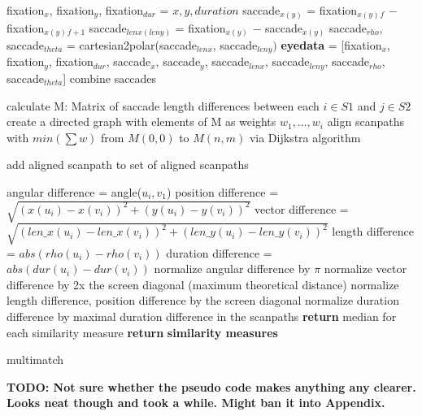 \documentclass[a4paper, 12pt]{scrreprt}
\begin{document}
\begin{algorithm}[H]
	\begin{small}
		
		{ 
			{
				fixation$_x$, fixation$_y$, fixation$_{dur}$ = $x, y, duration$ \;
				saccade$_{x(y)}$ = fixation$_{x(y)}$$_{f}$ $-$ fixation$_{x(y)}$$_{f+1}$ \;
				saccade$_{lenx(leny)}$ = fixation$_{x(y)}$ $-$ saccade$_{x(y)}$\;
				saccade$_{rho}$, saccade$_{theta}$ = cartesian2polar(saccade$_{lenx}$, saccade$_{leny})$ \;
				\textbf{eyedata} = [fixation$_x$, fixation$_y$, fixation$_{dur}$, saccade$_x$, saccade$_y$, \newline saccade$_{lenx}$, saccade$_{leny}$, saccade$_{rho}$, saccade$_{theta}$]
			}
			{
				{
					{combine saccades}
				}
			}
		}
		{
			calculate M: Matrix of saccade length differences between each $i \in S1$ and  $j \in S2$\;
			create a directed graph with elements of M as weights $w_1, \ldots, w_i$\;
			align scanpaths with $min(\sum w)$ from $M(0,0)$ to $M(n,m)$ via Dijkstra algorithm\;
			
			add aligned scanpath to set of aligned scanpaths \;
			
			{
				angular difference = angle($u_i, v_1$)\;
				position difference = $\sqrt{(x(u_i) - x(v_i))^2 + (y(u_i) - y(v_i))^2}$ \;
				vector difference = $\sqrt{(len\_x(u_i) - len\_x(v_i))^2 + (len\_y(u_i) - len\_y(v_i))^2}$\;
				length difference = $abs(rho(u_i) - rho(v_i))$\;
				duration difference = $abs(dur(u_i)-dur(v_i))$ \;
			}
			normalize angular difference by $\pi$\;
			normalize vector difference by 2x the screen diagonal (maximum theoretical distance)\;
			normalize length difference, position difference by the screen diagonal\;
			normalize duration difference by maximal duration difference in the scanpaths\;
			\textbf{return} median for each similarity measure
			\textbf{return} \textbf{similarity measures}
		}
		\caption{multimatch}
		\label{algo:multimatch}
	\end{small}
\end{algorithm}
\textbf{TODO: Not sure whether the pseudo code makes anything any clearer. Looks neat though and took a while. Might ban it into Appendix.}
\end{document}
